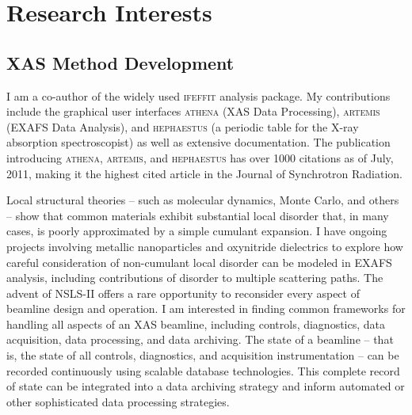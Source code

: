 \documentclass[11pt]{moderncv}
\begin{document}
\section{Research Interests}

\subsection{XAS Method Development}
%
{I am a co-author of the widely used \textsc{ifeffit} analysis
  package.  My contributions include the graphical user interfaces
  \textsc{athena} (XAS Data Processing), \textsc{artemis} (EXAFS Data
  Analysis), and \textsc{hephaestus} (a periodic table for the X-ray
  absorption spectroscopist) as well as extensive documentation.
  \newline{} The publication introducing \textsc{athena},
  \textsc{artemis}, and \textsc{hephaestus} has over 1000 citations as
  of July, 2011, making it the highest cited article in the Journal of
  Synchrotron Radiation.}

%
{Local structural theories -- such as molecular dynamics, Monte Carlo,
  and others -- show that common materials exhibit substantial local
  disorder that, in many cases, is poorly approximated by a simple
  cumulant expansion.  I have ongoing projects involving metallic
  nanoparticles and oxynitride dielectrics to explore how careful
  consideration of non-cumulant local disorder can be modeled in EXAFS
  analysis, including contributions of disorder to multiple scattering
  paths.}
%
%
{The advent of NSLS-II offers a rare opportunity to reconsider every
  aspect of beamline design and operation.  I am interested in finding
  common frameworks for handling all aspects of an XAS beamline,
  including controls, diagnostics, data acquisition, data processing,
  and data archiving.  The state of a beamline -- that is, the state
  of all controls, diagnostics, and acquisition instrumentation -- can
  be recorded continuously using scalable database technologies.  This
  complete record of state can be integrated into a data archiving
  strategy and inform automated or other sophisticated data processing
  strategies.}
\end{document}
